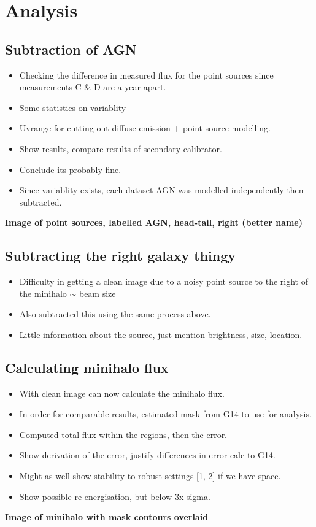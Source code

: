 \documentclass{pas}
\begin{document}
\section{Analysis}

\subsection{Subtraction of AGN}
\begin{itemize}
  \item Checking the difference in measured flux for the point sources since measurements C \& D are a year apart.
  \item Some statistics on variablity
  \item Uvrange for cutting out diffuse emission + point source modelling.
  \item Show results, compare results of secondary calibrator. 
  \item Conclude its probably fine.
  \item Since variablity exists, each dataset AGN was modelled independently then subtracted.
\end{itemize}
\textbf{Image of point sources, labelled AGN, head-tail, right (better name)}

\subsection{Subtracting the right galaxy thingy}
\begin{itemize}
  \item Difficulty in getting a clean image due to a noisy point source to the right of the minihalo $\sim$ beam size
  \item Also subtracted this using the same process above.
  \item Little information about the source, just mention brightness, size, location.
\end{itemize}

\subsection{Calculating minihalo flux}

\begin{itemize}
  \item With clean image can now calculate the minihalo flux.
  \item In order for comparable results, estimated mask from G14 to use for analysis.
  \item Computed total flux within the regions, then the error. 
  \item Show derivation of the error, justify differences in error calc to G14.
  \item Might as well show stability to robust settings [1, 2] if we have space.
  \item Show possible re-energisation, but below 3x sigma. 
\end{itemize}
\textbf{Image of minihalo with mask contours overlaid}
\end{document}
